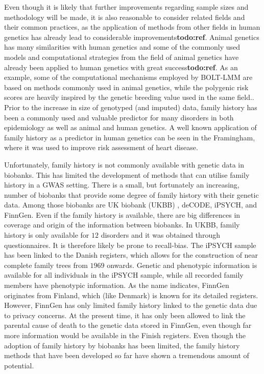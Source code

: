 Even though it is likely that further improvements regarding sample sizes and methodology will be made, it is also reasonable to consider related fields and their common practices, as the application of methods from other fields in human genetics has already lead to considerable improvements\textbf{todo:ref}. Animal genetics has many similarities with human genetics and some of the commonly used models and computational strategies from the field of animal genetics have already been applied to human genetics with great success\textbf{todo:ref}. As an example, some of the computational mechanisms employed by BOLT-LMM are based on methods commonly used in animal genetics, while the polygenic risk scores are heavily inspired by the genetic breeding value used in the same field.\cite{loh2015efficient,wray2019complex,meuwissen2001prediction}. Prior to the increase in size of genotyped (and imputed) data, family history has been a commonly used and valuable predictor for many disorders in both epidemiology as well as animal and human genetics\cite{guttmacher2004family,runeson2003family,collaborative2001familial,johns2001systematic}. A well known application of family history as a predictor in human genetics can be seen in the Framingham, where it was used to improve risk assessment of heart disease\cite{kannel1990contribution,splansky2007third}.

Unfortunately, family history is not commonly available with genetic data in biobanks. This has limited the development of methods that can utilise family history in a GWAS setting. There is a small, but fortunately an increasing, number of biobanks that provide some degree of family history with their genetic data. Among those biobanks are UK biobank (UKBB) \cite{bycroft2018uk}, deCODE\cite{noauthor_2012-jh}, iPSYCH\cite{bybjerg2020ipsych2015}, and FinnGen\cite{Kurki2022-pt}. Even if the family history is available, there are big differences in coverage and origin of the information between biobanks. In UKBB, family history is only available for $ 12 $ disorders and it was obtained through questionnaires. It is therefore likely be prone to recall-bias. The iPSYCH sample has been linked to the Danish registers, which allows for the construction of near complete family trees from $ 1969 $ onwards. Genetic and phenotypic information is available for all individuals in the iPSYCH sample, while all recorded family members have phenotypic information. As the name indicates, FinnGen originates from Finland, which (like Denmark) is known for its detailed registers. However, FinnGen has only limited family history linked to the genetic data due to privacy concerns. At the present time, it has only been allowed to link the parental cause of death to the genetic data stored in FinnGen, even though far more information would be available in the Finish registers. Even though the adoption of family history by biobanks has been limited, the family history methods that have been developed so far have shown a tremendous amount of potential. 


